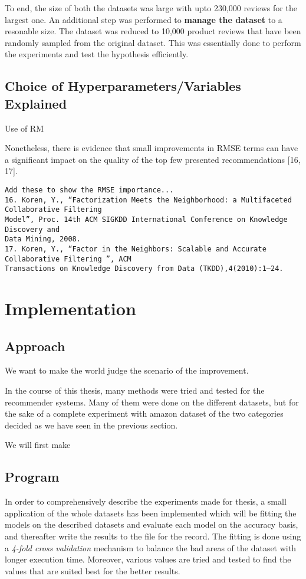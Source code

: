 To end, the size of both the datasets was large with upto 230,000 reviews for the largest one. An additional step was performed to \textbf{manage the dataset} to a resonable size. The dataset was reduced to 10,000 product reviews that have been randomly sampled from the original dataset. This was essentially done to perform the experiments and test the hypothesis efficiently.


\subsection{Choice of Hyperparameters/Variables Explained}

Use of RM


Nonetheless, there is evidence that small improvements in RMSE terms can have a significant impact on the quality of the top few presented recommendations [16, 17].

\begin{verbatim}
Add these to show the RMSE importance...
16. Koren, Y., “Factorization Meets the Neighborhood: a Multifaceted Collaborative Filtering
Model”, Proc. 14th ACM SIGKDD International Conference on Knowledge Discovery and
Data Mining, 2008.
17. Koren, Y., “Factor in the Neighbors: Scalable and Accurate Collaborative Filtering ”, ACM
Transactions on Knowledge Discovery from Data (TKDD),4(2010):1–24.
\end{verbatim}





\section{Implementation}
\subsection{Approach}
We want to make the world judge the scenario of the improvement.

In the course of this thesis, many methods were tried and tested for the recommender systems. Many of them were done on the different datasets, but for the sake of a complete experiment with amazon dataset of the two categories decided as we have seen in the previous section. 

We will first make 


\subsection{Program}
In order to comprehensively describe the experiments made for thesis, a small application of the whole datasets has been implemented which will be fitting the models on the described datasets and evaluate each model on the accuracy basis, and thereafter write the results to the file for the record. The fitting is done using a \textit{4-fold cross validation} mechanism to balance the bad areas of the dataset with longer execution time. Moreover, various values are tried and tested to find the values that are suited best for the better results.

